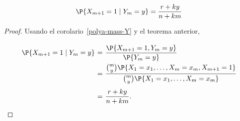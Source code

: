 \begin{corollary}
    \[ \P\{X_{m+1} = 1 \;|\; Y_m = y\} = \frac{r+ky}{n+km} \]
\end{corollary}
\begin{proof}
    Usando el corolario~\ref{polya-mass-Y} y el teorema anterior,
    \[ \everymath{\displaystyle}
    \arraycolsep=1.8pt\def\arraystretch{2.5}
    \begin{array}{rcl}
        \P\{X_{m+1} = 1 \;|\; Y_m = y\} & = & \frac{\P\{X_{m+1} = 1, Y_m = y\}}{\P\{Y_m = y\}}\\
        & = & \frac{\binom{m}{y} \P\{X_1 = x_1, \ldots, X_m = x_m, X_{m+1} = 1\}}{\binom{m}{y} \P\{X_1 = x_1, \ldots, X_m = x_m\} }\\
        & = & \frac{r+ky}{n+km}.
    \end{array} \]
\end{proof}